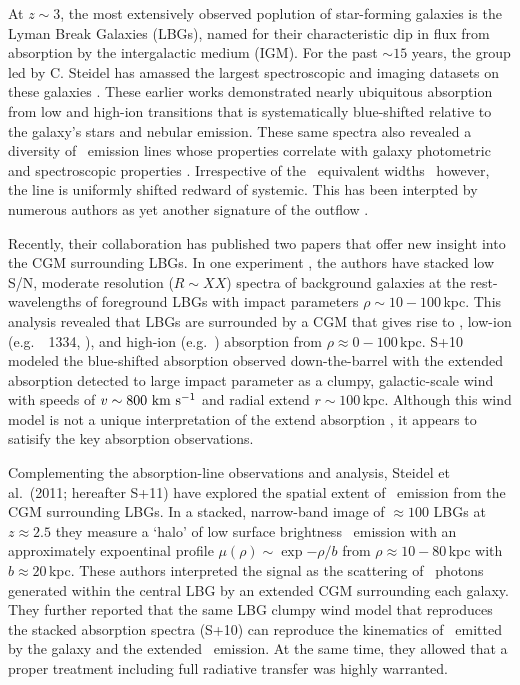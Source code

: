 \documentclass[12pt,preprint]{aastex}
\begin{document}
At $z\sim 3$, the most extensively observed poplution of star-forming
galaxies is the Lyman Break Galaxies (LBGs), named for their
characteristic dip in flux from absorption by the intergalactic medium
(IGM).  For the past $\sim 15$ years, the group led by C. Steidel has
amassed the largest spectroscopic and imaging datasets on these
galaxies \citep{steidel96,shapley03,reddyXX}.  These earlier works
demonstrated nearly ubiquitous absorption from low and high-ion
transitions that is systematically blue-shifted relative to the
galaxy's stars and nebular emission.  These same spectra also revealed
a diversity of \lya\ emission lines whose properties correlate with galaxy photometric
and spectroscopic properties \citep{shapley08,cooke08}.  Irrespective
of the \lya\ equivalent widths \wlya\, however, the line is uniformly
shifted redward of systemic.  This has been interpted by numerous
authors as yet another signature of the outflow
\citep[e.g.][]{pettini,verhamme}. 

Recently, their
collaboration has published two papers that offer new insight into the
CGM surrounding LBGs.   In one experiment \citep[][hereafter
S+10]{steidel+10}, the authors have stacked low S/N, moderate
resolution ($R \sim XX$) spectra of background galaxies at the
rest-wavelengths of foreground LBGs with impact parameters $\rho \sim
10-100$\,kpc.  This analysis revealed that LBGs are surrounded by a
CGM that gives rise to , low-ion (e.g.\ ~1334,
), and high-ion (e.g.\ ) absorption from $\rho
\approx 0-100$\,kpc.  S+10 modeled the blue-shifted absorption
observed down-the-barrel with the extended absorption detected to
large impact parameter as a clumpy, galactic-scale wind with speeds of
$v \sim 800 \, \, {\rm km~s^{-1}}$ and radial extend $r \sim 100$\,kpc.  Although
this wind model is not a unique interpretation of the extend
 absorption \citep{fpk+11}, it appears to satisify the key
absorption observations.

Complementing the absorption-line observations and analysis,
Steidel et al.\ (2011; hereafter S+11) have explored the spatial
extent of \lya\ emission from the CGM surrounding LBGs.  In a stacked,
narrow-band image of $\approx 100$ LBGs at $z \approx 2.5$ they
measure a `halo' of low surface brightness \lya\ emission with an
approximately expoentinal profile $\mu(\rho) \sim \exp{-\rho/b}$ from
$\rho \approx 10-80$\,kpc with $b \approx 20$\,kpc.  These authors
interpreted the signal as the scattering of \lya\ photons generated
within the central LBG by an extended CGM surrounding each galaxy.
They further reported that the same LBG clumpy wind model that
reproduces the stacked absorption spectra (S+10) can reproduce the
kinematics of \lya\ emitted by the galaxy and the extended \lya\
emission.  At the same time, they allowed that a proper treatment
including full radiative transfer was highly warranted.  
\end{document}
